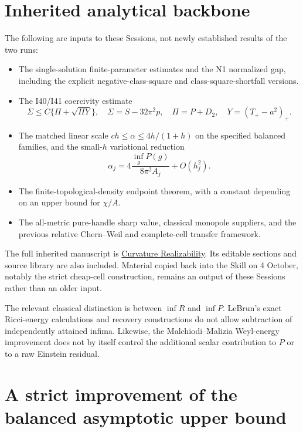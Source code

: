 \documentclass[
]{article}
\providecommand{\tightlist}{%
  \setlength{\itemsep}{0pt}\setlength{\parskip}{0pt}}
\begin{document}
\hypertarget{inherited-analytical-backbone}{%
\section{Inherited analytical
backbone}\label{inherited-analytical-backbone}}

The following are inputs to these Sessions, not newly established
results of the two runs:

\begin{itemize}
\tightlist
\item
  The single-solution finite-parameter estimates and the N1 normalized
  gap, including the explicit negative-class-square and
  class-square-shortfall versions.
\item
  The I40/I41 coercivity estimate \[
  \Sigma\le C\{\Pi+\sqrt{\Pi Y}\},\quad
  \Sigma=S-32\pi^2p,\quad \Pi=P+D_2,\quad Y=(T_+-a^2)_+.
  \]
\item
  The matched linear scale \(ch\le\alpha\le4h/(1+h)\) on the specified
  balanced families, and the small-\(h\) variational reduction \[
  \alpha_j=4\frac{\inf_gP(g)}{8\pi^2A_j}+O(h_j^2).
  \]
\item
  The finite-topological-density endpoint theorem, with a constant
  depending on an upper bound for \(\chi/A\).
\item
  The all-metric pure-handle sharp value, classical monopole suppliers,
  and the previous relative Chern--Weil and complete-cell transfer
  framework.
\end{itemize}

The full inherited manuscript is
\href{sources/Skills/geometric-analysis/research/Curvature_Realizability.tex}{Curvature
Realizability}. Its editable sections and source library are also
included. Material copied back into the Skill on 4 October, notably the
strict cheap-cell construction, remains an output of these Sessions
rather than an older input.

The relevant classical distinction is between \(\inf R\) and \(\inf P\).
LeBrun's exact Ricci-energy calculations and recovery constructions do
not allow subtraction of independently attained infima. Likewise, the
Malchiodi--Malizia Weyl-energy improvement does not by itself control
the additional scalar contribution to \(P\) or to a raw Einstein
residual.

\hypertarget{a-strict-improvement-of-the-balanced-asymptotic-upper-bound}{%
\section{A strict improvement of the balanced asymptotic upper
bound}\label{a-strict-improvement-of-the-balanced-asymptotic-upper-bound}}
\end{document}
